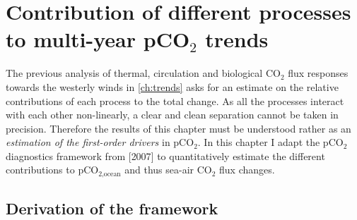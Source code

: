 \chapter{Contribution of different processes to multi-year pCO$_2$ trends} %
%
\label{ch:pCO2separation}

The previous analysis of thermal, circulation and biological CO$_2$ flux responses towards the westerly winds in \autoref{ch:trends} asks for an estimate on the relative contributions of each process to the total change. As all the processes interact with each other non-linearly, a clear and clean separation cannot be taken in precision. Therefore the results of this chapter must be understood rather as an \textit{estimation of the first-order drivers} in pCO$_2$. In this chapter I adapt the pCO$_2$ diagnostics framework from \citeauthor{Lovenduski2007} [{\color{RoyalBlue}2007}] to quantitatively estimate the different contributions to pCO$_{\text{2,ocean}}$ and thus sea-air CO$_2$ flux changes.

\section{Derivation of the framework}

